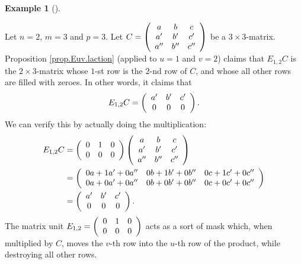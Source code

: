 \documentclass[numbers=enddot,12pt,final,onecolumn,notitlepage]{scrartcl}%
\theoremstyle{definition}
\newtheorem{exam}[theo]{Example}
\newenvironment{example}[1][]
{\begin{exam}[#1]\begin{leftbar}}
{\end{leftbar}\end{exam}}
\begin{document}
\begin{example}
Let $n=2$, $m=3$ and $p=3$. Let $C=\left(
\begin{array}
[c]{ccc}%
a & b & c\\
a^{\prime} & b^{\prime} & c^{\prime}\\
a^{\prime\prime} & b^{\prime\prime} & c^{\prime\prime}%
\end{array}
\right)  $ be a $3\times3$-matrix. Proposition \ref{prop.Euv.laction} (applied
to $u=1$ and $v=2$) claims that $E_{1,2}C$ is the $2\times3$-matrix whose
$1$-st row is the $2$-nd row of $C$, and whose all other rows are filled with
zeroes. In other words, it claims that%
\[
E_{1,2}C=\left(
\begin{array}
[c]{ccc}%
a^{\prime} & b^{\prime} & c^{\prime}\\
0 & 0 & 0
\end{array}
\right)  .
\]
We can verify this by actually doing the multiplication:%
\begin{align*}
E_{1,2}C  &  =\left(
\begin{array}
[c]{ccc}%
0 & 1 & 0\\
0 & 0 & 0
\end{array}
\right)  \left(
\begin{array}
[c]{ccc}%
a & b & c\\
a^{\prime} & b^{\prime} & c^{\prime}\\
a^{\prime\prime} & b^{\prime\prime} & c^{\prime\prime}%
\end{array}
\right) \\
&  =\left(
\begin{array}
[c]{ccc}%
0a+1a^{\prime}+0a^{\prime\prime} & 0b+1b^{\prime}+0b^{\prime\prime} &
0c+1c^{\prime}+0c^{\prime\prime}\\
0a+0a^{\prime}+0a^{\prime\prime} & 0b+0b^{\prime}+0b^{\prime\prime} &
0c+0c^{\prime}+0c^{\prime\prime}%
\end{array}
\right) \\
&  =\left(
\begin{array}
[c]{ccc}%
a^{\prime} & b^{\prime} & c^{\prime}\\
0 & 0 & 0
\end{array}
\right)  .
\end{align*}
The matrix unit $E_{1,2}=\left(
\begin{array}
[c]{ccc}%
0 & 1 & 0\\
0 & 0 & 0
\end{array}
\right)  $ acts as a sort of mask which, when multiplied by $C$, moves the
$v$-th row into the $u$-th row of the product, while destroying all other rows.
\end{example}
\end{document}
